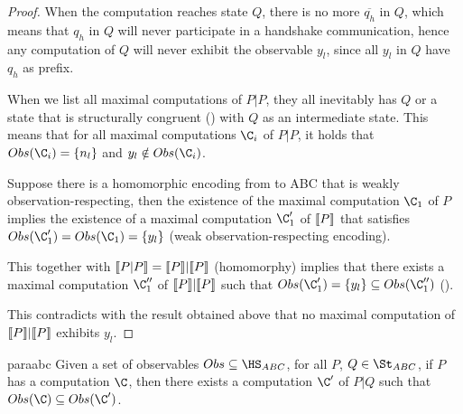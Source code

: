 \documentclass[adraft,hidelinks]{eptcs}
\begin{document}
\begin{proof}
    When the computation reaches state $Q$, there is no more $\overline{q_h}$ in $Q$, which means that $q_h$ in $Q$ will never participate in a handshake communication, hence any computation of $Q$ will never exhibit the observable $y_l$, since all $y_l$ in $Q$ have $q_h$ as prefix.

    When we list all maximal computations of $P|P$, they all inevitably has $Q$ or a state that is structurally congruent () with $Q$ as an intermediate state.
    This means that for all maximal computations $\C_i$ of $P|P$, it holds that $\Ob{\C_i}=\{n_l\}$ and $y_l\notin \Ob{\C_i}$.

    Suppose there is a homomorphic encoding from \CSG to ABC that is weakly observation-respecting, then the existence of the maximal computation $\C_1$ of $P$ implies the existence of a maximal computation $\C_1'$ of $\bkt{P}$ that satisfies $\Ob{\C_1'} = \Ob{\C_1} = \{y_l\}$ (weak observation-respecting encoding).

    This together with $\bkt{P|P} = \bkt{P}|\bkt{P}$ (homomorphy) implies that there exists a maximal computation $\C_1''$ of $\bkt{P}|\bkt{P}$ such that $\Ob{\C_1'} = \{y_l\}\subseteq \Ob{\C_1''}$ ().

    This contradicts with the result obtained above that no maximal computation of $\bkt{P}|\bkt{P}$ exhibits $y_l$.
\end{proof}

\begin{lemma}{paraabc}
  Given a set of observables $Obs\subseteq\HS_{ABC}$, for all $P$, $Q\in\St_{ABC}$, if $P$ has a computation $\C$, then there exists a computation $\C'$ of $P|Q$ such that $\Ob{\C}\subseteq\Ob{\C'}$.
\end{lemma}
\end{document}
